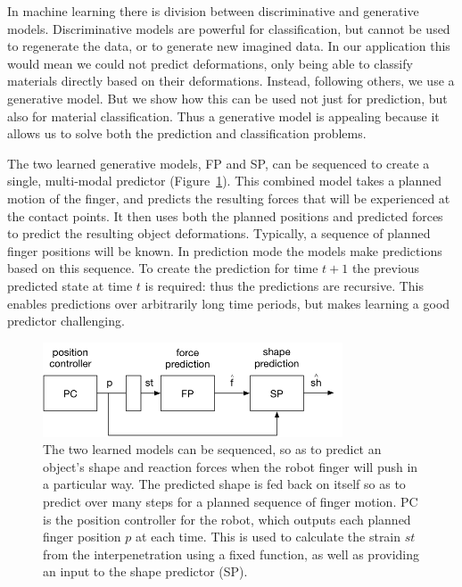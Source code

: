 \documentclass[journal]{IEEEtran}
\newcommand{\comment}[1]{{\color{red} #1}}
\begin{document}
\comment{In machine learning there is division between discriminative and generative models. Discriminative models are powerful for classification, but cannot be used to regenerate the data, or to generate new imagined data. In our application this would mean we could not predict deformations, only being able to classify materials directly based on their deformations. Instead, following others, we use a generative model. But we show how this can be used not just for prediction, but also for material classification. Thus a generative model is appealing because it allows us to solve both the prediction and classification problems.}

The two learned generative models, FP and SP, can be sequenced to create a single, multi-modal predictor (Figure~\ref{fig:prediction}). This combined model takes a planned motion of the finger, and predicts the resulting forces that will be experienced at the contact points. It then uses both the planned positions and predicted forces to predict the resulting object deformations. Typically, a sequence of planned finger positions will be known. In prediction mode the models make predictions based on this sequence. To create the prediction for time $t+1$ the previous predicted state at time $t$ is required: thus the predictions are recursive. This enables predictions over arbitrarily long time periods, but makes learning a good predictor challenging.

\begin{figure}[t]
\centering
\includegraphics[width=3.5in]{figures/prediction}%
\caption{The two learned models can be sequenced, so as to predict an object's shape and reaction forces when the robot finger will push in a particular way. The predicted shape is fed back on itself so as to predict over many steps for a planned sequence of finger motion. PC is the position controller for the robot, which outputs each planned finger position $p$ at each time. This is used to calculate the strain $st$ from the interpenetration using a fixed function, as well as providing an input to the shape predictor (SP).}
\label{fig:prediction}
\end{figure}
\end{document}
